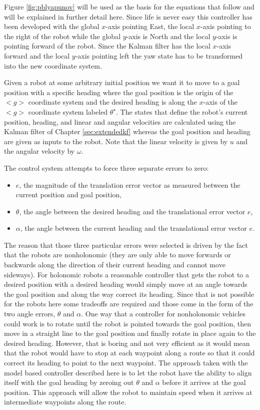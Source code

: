 Figure \ref{fig:pblyapunov} will be used as the basis for the equations that follow and will be explained in further detail here. Since life is never easy this controller has been developed with the global $x$-axis pointing East, the local $x$-axis pointing to the right of the robot while the global $y$-axis is North and the local $y$-axis is pointing forward of the robot. Since the Kalman filter has the local $x$-axis forward and the local $y$-axis pointing left the yaw state has to be transformed into the new coordinate system.

Given a robot at some arbitrary initial position we want it to move to a goal position with a specific heading where the goal position is the origin of the $<g>$ coordinate system and the desired heading is along the $x$-axis of the $<g>$ coordinate system labeled $\theta^\star$. The states that define the robot's current position, heading, and linear and angular velocities are calculated using the Kalman filter of Chapter \ref{sec:extendedkf} whereas the goal position and heading are given as inputs to the robot. Note that the linear velocity is given by $u$ and the angular velocity by $\omega$.

The control system attempts to force three separate errors to zero:
\begin{itemize}
\item $e$, the magnitude of the translation error vector as measured between the current position and goal position,
\item $\theta$, the angle between the desired heading and the translational error vector $e$,
\item $\alpha$, the angle between the current heading and the translational error vector $e$.
\end{itemize}

The reason that those three particular errors were selected is driven by the fact that the robots are nonholonomic (they are only able to move forwards or backwards along the direction of their current heading and cannot move sideways). For holonomic robots a reasonable controller that gets the robot to a desired position with a desired heading would simply move at an angle towards the goal position and along the way correct its heading. Since that is not possible for the robots here some tradeoffs are required and those come in the form of the two angle errors, $\theta$ and $\alpha$. One way that a controller for nonholonomic vehicles could work is to rotate until the robot is pointed towards the goal position, then move in a straight line to the goal position and finally rotate in place again to the desired heading. However, that is boring and not very efficient as it would mean that the robot would have to stop at each waypoint along a route so that it could correct its heading to point to the next waypoint. The approach taken with the model based controller described here is to let the robot have the ability to align itself with the goal heading by zeroing out $\theta$ and $\alpha$ before it arrives at the goal position. This approach will allow the robot to maintain speed when it arrives at intermediate waypoints along the route.

